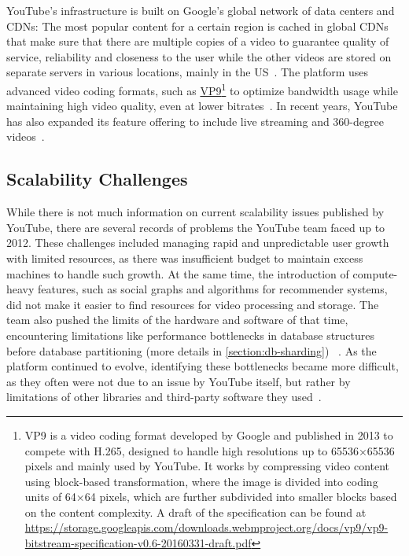 \noindent YouTube's infrastructure is built on Google's global network of data centers and \ac{CDN}s: The most popular content for a certain region is cached in global \ac{CDN}s that make sure that there are multiple copies of a video to guarantee quality of service, reliability and closeness to the user while the other videos are stored on separate servers in various locations, mainly in the US~\parencite{youtube_architecture_2}. The platform uses advanced video coding formats, such as \href{https://developers.google.com/media/vp9}{VP9}\footnote{VP9 is a video coding format developed by Google and published in 2013 to compete with H.265, designed to handle high resolutions up to 65536×65536 pixels and mainly used by YouTube. It works by compressing video content using block-based transformation, where the image is divided into coding units of 64×64 pixels, which are further subdivided into smaller blocks based on the content complexity. A draft of the specification can be found at \url{https://storage.googleapis.com/downloads.webmproject.org/docs/vp9/vp9-bitstream-specification-v0.6-20160331-draft.pdf}} to optimize bandwidth usage while maintaining high video quality, even at lower bitrates~\parencite{youtube_vpu}. 
In recent years, YouTube has also expanded its feature offering to include live streaming and 360-degree videos~\parencite{youtube_live}.




\subsection{Scalability Challenges}\label{subsection:yt-scalability-challenges}

While there is not much information on current scalability issues published by YouTube, there are several records of problems the YouTube team faced up to 2012. These challenges included managing rapid and unpredictable user growth with limited resources, as there was insufficient budget to maintain excess machines to handle such growth. At the same time, the introduction of compute-heavy features, such as social graphs and algorithms for recommender systems, did not make it easier to find resources for video processing and storage. The team also pushed the limits of the hardware and software of that time, encountering limitations like performance bottlenecks in database structures before database partitioning (more details in \autoref{section:db-sharding}) ~\parencite{youtube_challenges}. As the platform continued to evolve, identifying these bottlenecks became more difficult, as they often were not due to an issue by YouTube itself, but rather by limitations of other libraries and third-party software they used~\parencite{youtube_challenges_2}.

